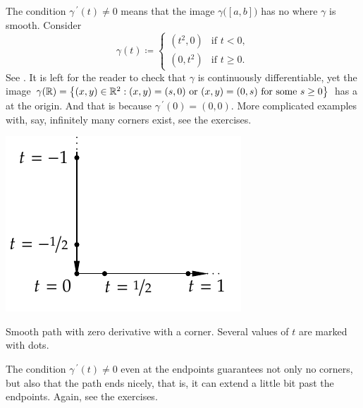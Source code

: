 \begin{example}
The condition $\gamma^{\:\prime}(t) \not= 0$ means that the image
$\gamma\bigl([a,b]\bigr)$
has no  where $\gamma$ is smooth.
Consider 
\begin{equation*}
\gamma(t) \coloneqq
\begin{cases}
(t^2,0) & \text{if } t < 0,\\
(0,t^2) & \text{if } t \geq 0.
\end{cases}
\end{equation*}
See .
It is left for the reader to check that $\gamma$ is continuously
differentiable, yet the image $\gamma({\mathbb{R}}) = \bigl\{ (x,y) \in {\mathbb{R}}^2 : (x,y) =
(s,0) \text{ or } (x,y) = (0,s) \text{ for some } s \geq 0 \bigr\}$ has a
 at the origin.  And that is because $\gamma^{\:\prime}(0) = (0,0)$.
More complicated examples with, say, infinitely many corners exist,
see the exercises.
\begin{myfigureht}
\includegraphics{figures/cornersmoothpath}
\caption{Smooth path with zero derivative with a corner.  Several values of
$t$ are marked with dots.\label{fig:cornersmoothpath}}
\end{myfigureht}
\end{example}

The condition $\gamma^{\:\prime}(t) \not= 0$ even at the endpoints guarantees
not only no corners, but also that the path ends nicely, that is, it can
extend a little bit past the endpoints.  Again, see the exercises.


